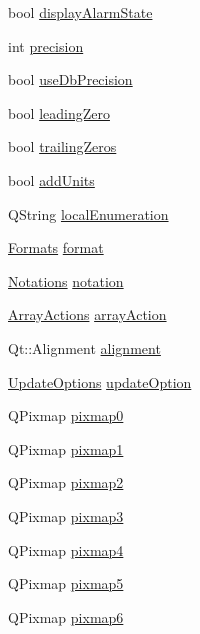 \begin{DoxyCompactItemize}
bool \hyperlink{classQECheckBox_ad5d25fa41def4241df71dee0d003efc4}{displayAlarmState}
\item 
int \hyperlink{classQECheckBox_a24743b70dcbdbe44c90124d366b15821}{precision}
\item 
bool \hyperlink{classQECheckBox_aa1d58ade253e2c37efda416af56828ad}{useDbPrecision}
\item 
bool \hyperlink{classQECheckBox_adc5f39f75575556f2d61b7ac58febaaa}{leadingZero}
\item 
bool \hyperlink{classQECheckBox_a49cdbc59074b1c5baeeddcd75a60cef1}{trailingZeros}
\item 
bool \hyperlink{classQECheckBox_a0d336bc2775142c8cafd7693efa41cbf}{addUnits}
\item 
QString \hyperlink{classQECheckBox_a84e3a7d33551b227db49d75fe66da417}{localEnumeration}
\item 
\hyperlink{classQECheckBox_a6bcb0491c8e54ad5f8dd06b364e155b0}{Formats} \hyperlink{classQECheckBox_a3fc952f7bfae3bcf56eae3ea93e444e9}{format}
\item 
\hyperlink{classQECheckBox_ae67c8b643fb1a64002f65b2b4ad07d82}{Notations} \hyperlink{classQECheckBox_a2a12d710a7a113a8156f4bf3cc98e91a}{notation}
\item 
\hyperlink{classQECheckBox_a5e41abe405ee8fca4bb9dbfbde1c1061}{ArrayActions} \hyperlink{classQECheckBox_a4d3f55ae57f2c8d5b9a315b4ffb5a3b4}{arrayAction}
\item 
Qt::Alignment \hyperlink{classQECheckBox_a701a4b21a9a6dd620cf02fe20b338859}{alignment}
\item 
\hyperlink{classQECheckBox_aae0115012f096f2271246683f4d338fe}{UpdateOptions} \hyperlink{classQECheckBox_a538be95fcea8bb39b021906ea3147b1b}{updateOption}
\item 
QPixmap \hyperlink{classQECheckBox_aae33c34105700e7c6d38bdb10b81b7b8}{pixmap0}
\item 
QPixmap \hyperlink{classQECheckBox_a8397e5fc7e993fa152ae60f1c7cf1400}{pixmap1}
\item 
QPixmap \hyperlink{classQECheckBox_a5605d3d4c7bef8cdb45efe5656c134b9}{pixmap2}
\item 
QPixmap \hyperlink{classQECheckBox_a633d366aed7204a0d7e5e2f6840dc742}{pixmap3}
\item 
QPixmap \hyperlink{classQECheckBox_aa08f0755f6cedb8e5853bae3a38c9ae4}{pixmap4}
\item 
QPixmap \hyperlink{classQECheckBox_ad7a88b536bf1061195f86fcffe5820e6}{pixmap5}
\item 
QPixmap \hyperlink{classQECheckBox_ac63a673d8295748727636181e72bf10b}{pixmap6}

\end{DoxyCompactItemize}
